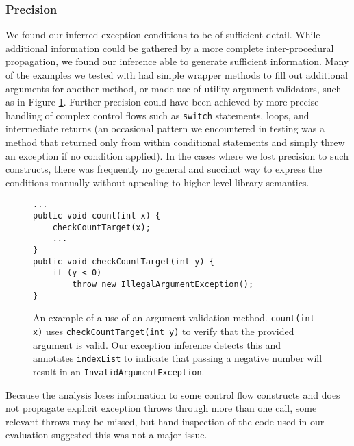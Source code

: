 \subsubsection{Precision}

We found our inferred exception conditions to be of sufficient detail.  While
additional information could be gathered by a more complete inter-procedural
propagation, we found our
inference able to generate sufficient information.  Many of the examples we
tested with had simple wrapper methods to
fill out additional arguments for another method, or made use of utility
argument validators, such as in Figure \ref{fig:argvalidate}.  Further precision
could have been achieved by more precise handling of complex control flows such
as \texttt{switch} statements, loops, and intermediate returns (an occasional
pattern we encountered in testing was a method that returned only from within
conditional statements and simply threw an exception if no condition applied).
In the cases where we lost precision to such constructs, there was frequently no
general and succinct way to express the conditions manually without appealing to
higher-level library semantics.

\begin{figure}
\begin{verbatim}
...
public void count(int x) {
    checkCountTarget(x);
    ...
}
public void checkCountTarget(int y) {
    if (y < 0)
        throw new IllegalArgumentException();
}
\end{verbatim}
\caption{An example of a use of an argument validation method.
\texttt{count(int x)} uses \texttt{checkCountTarget(int y)} to verify that the
provided argument is valid.  Our exception inference detects this and annotates
\texttt{indexList} to indicate that passing a negative number will result in an
\texttt{InvalidArgumentException}.}
\label{fig:argvalidate}
\end{figure}

Because the analysis loses information to some control flow constructs and does not
propagate explicit exception throws through more than one call, some relevant
throws may be missed, but hand inspection of the code used in our evaluation
suggested this was not a major issue.
